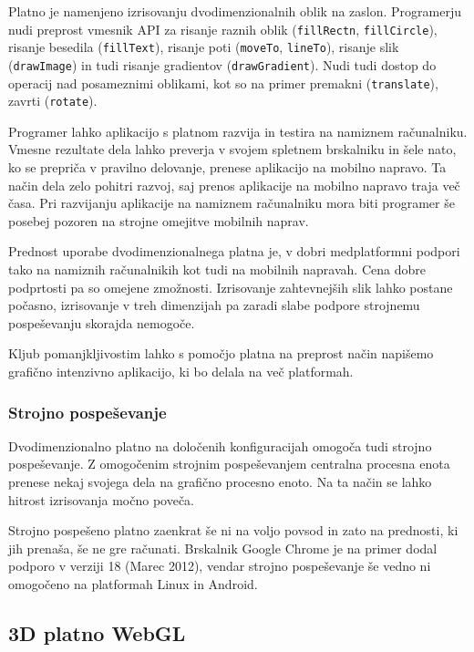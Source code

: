 
Platno je namenjeno izrisovanju dvodimenzionalnih oblik na zaslon. Programerju nudi preprost vmesnik API za risanje raznih oblik (\texttt{fillRectn}, \texttt{fillCircle}), risanje besedila (\texttt{fillText}), risanje poti (\texttt{moveTo}, \texttt{lineTo}), risanje slik (\texttt{drawImage}) in tudi risanje gradientov (\texttt{drawGradient}). Nudi tudi dostop do operacij nad posameznimi oblikami, kot so na primer premakni (\texttt{translate}), zavrti (\texttt{rotate}). 

Programer lahko aplikacijo s platnom razvija in testira na namiznem računalniku. Vmesne rezultate dela lahko preverja v svojem spletnem brskalniku in šele nato, ko se prepriča v pravilno delovanje, prenese aplikacijo na mobilno napravo. Ta način dela zelo pohitri razvoj, saj prenos aplikacije na mobilno napravo traja več časa. Pri razvijanju aplikacije na namiznem računalniku mora biti programer še posebej pozoren na strojne omejitve mobilnih naprav. 

Prednost uporabe dvodimenzionalnega platna je, v dobri medplatformni podpori tako na namiznih računalnikih kot tudi na mobilnih napravah. Cena dobre podprtosti pa so omejene zmožnosti. Izrisovanje zahtevnejših slik lahko postane počasno, izrisovanje v treh dimenzijah pa zaradi slabe podpore strojnemu pospeševanju skorajda nemogoče. 

Kljub pomanjkljivostim lahko s pomočjo platna na preprost način napišemo grafično intenzivno aplikacijo, ki bo delala na več platformah. 

\subsubsection{Strojno pospeševanje}

Dvodimenzionalno platno na določenih konfiguracijah omogoča tudi strojno pospeševanje. Z omogočenim strojnim pospeševanjem centralna procesna enota prenese nekaj svojega dela na grafično procesno enoto. Na ta način se lahko hitrost izrisovanja močno poveča.

Strojno pospešeno platno zaenkrat še ni na voljo povsod in zato na prednosti, ki jih prenaša, še ne gre računati. Brskalnik Google Chrome je na primer dodal podporo v verziji 18 (Marec 2012), vendar strojno pospeševanje še vedno ni omogočeno na platformah Linux in Android.

\subsection{3D platno WebGL}
\label{sec:WebGL}


